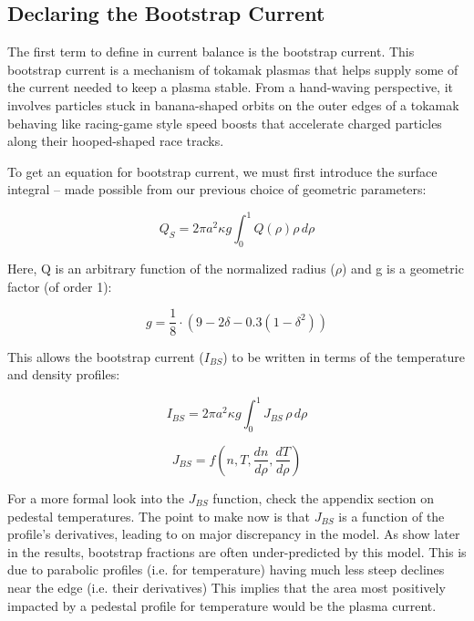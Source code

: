\subsection{Declaring the Bootstrap Current}

The first term to define in current balance is the bootstrap current. This bootstrap current is a mechanism of tokamak plasmas that helps supply some of the current needed to keep a plasma stable. From a hand-waving perspective, it involves particles stuck in banana-shaped orbits on the outer edges of a tokamak behaving like racing-game style speed boosts that accelerate charged particles along their hooped-shaped race tracks.

To get an equation for bootstrap current, we must first introduce the surface integral -- made possible from our previous choice of geometric parameters:

\begin{equation}
	Q_S = 2 \pi a^2 \kappa g \int_0^1 Q(\rho) \rho \, d\rho
\end{equation}

Here, Q is an arbitrary function of the normalized radius ($\rho$) and g is a geometric factor (of order 1):

\begin{equation}
	g = \frac{1}{8} \cdot \left( 9 - 2 \delta - 0.3 \left( 1 - \delta^2 \right)  \right)
\end{equation}
 
This allows the bootstrap current ($I_{BS}$) to be written in terms of the temperature and density profiles:

\begin{equation}
	I_{BS} = 2 \pi a^2 \kappa g \int_0^1 J_{BS} \, \rho \, d\rho
\end{equation}

\begin{equation}
	J_{BS} = f\left( n , T , \frac{dn}{d\rho} , \frac{dT}{d\rho}  \right)
\end{equation}
 
For a more formal look into the $J_{BS}$ function, check the appendix section on pedestal temperatures. The point to make now is that $J_{BS}$ is a function of the profile's derivatives, leading to on major discrepancy in the model. As show later in the results, bootstrap fractions are often under-predicted by this model. This is due to parabolic profiles (i.e. for temperature) having much less steep declines near the edge (i.e. their derivatives) This implies that the area most positively impacted by a pedestal profile for temperature would be the plasma current.

